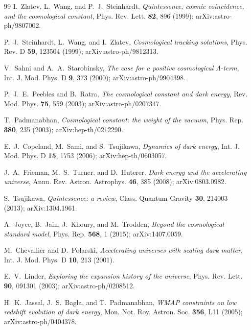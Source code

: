 \documentclass[11pt,reqno]{amsart}
\theoremstyle{plain}
\theoremstyle{definition}
\theoremstyle{remark}
\begin{document}
\begin{thebibliography}{99}
I.~Zlatev, L.~Wang, and P.~J.~Steinhardt,
\emph{Quintessence, cosmic coincidence, and the cosmological constant},
Phys. Rev. Lett. \textbf{82}, 896 (1999); arXiv:astro-ph/9807002.

P.~J.~Steinhardt, L.~Wang, and I.~Zlatev,
\emph{Cosmological tracking solutions},
Phys. Rev. D \textbf{59}, 123504 (1999); arXiv:astro-ph/9812313.

V.~Sahni and A.~A.~Starobinsky,
\emph{The case for a positive cosmological $\Lambda$-term},
Int. J. Mod. Phys. D \textbf{9}, 373 (2000); arXiv:astro-ph/9904398.

P.~J.~E.~Peebles and B.~Ratra,
\emph{The cosmological constant and dark energy},
Rev. Mod. Phys. \textbf{75}, 559 (2003); arXiv:astro-ph/0207347.

T.~Padmanabhan,
\emph{Cosmological constant: the weight of the vacuum},
Phys. Rep. \textbf{380}, 235 (2003); arXiv:hep-th/0212290.

E.~J.~Copeland, M.~Sami, and S.~Tsujikawa,
\emph{Dynamics of dark energy},
Int. J. Mod. Phys. D \textbf{15}, 1753 (2006); arXiv:hep-th/0603057.

J.~A.~Frieman, M.~S.~Turner, and D.~Huterer,
\emph{Dark energy and the accelerating universe},
Annu. Rev. Astron. Astrophys. \textbf{46}, 385 (2008); arXiv:0803.0982.

S.~Tsujikawa,
\emph{Quintessence: a review},
Class. Quantum Gravity \textbf{30}, 214003 (2013); arXiv:1304.1961.

A.~Joyce, B.~Jain, J.~Khoury, and M.~Trodden,
\emph{Beyond the cosmological standard model},
Phys. Rep. \textbf{568}, 1 (2015); arXiv:1407.0059.

M.~Chevallier and D.~Polarski,
\emph{Accelerating universes with scaling dark matter},
Int. J. Mod. Phys. D \textbf{10}, 213 (2001).

E.~V.~Linder,
\emph{Exploring the expansion history of the universe},
Phys. Rev. Lett. \textbf{90}, 091301 (2003); arXiv:astro-ph/0208512.

H.~K.~Jassal, J.~S.~Bagla, and T.~Padmanabhan,
\emph{WMAP constraints on low redshift evolution of dark energy},
Mon. Not. Roy. Astron. Soc. \textbf{356}, L11 (2005); arXiv:astro-ph/0404378.


\end{thebibliography}
\end{document}
